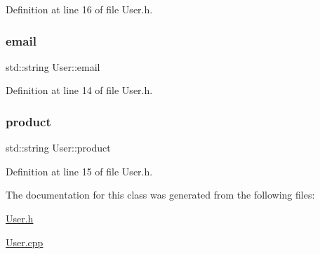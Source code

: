 Definition at line 16 of file User.\+h.

\mbox{\label{class_user_ac35b7c63228119cb91acdbd7ed32b8cb}} 
\subsubsection{\texorpdfstring{email}{email}}
{\footnotesize\ttfamily std\+::string User\+::email\hspace{0.3cm}{\ttfamily [private]}}



Definition at line 14 of file User.\+h.

\mbox{\label{class_user_a5f969245b125e607f44b1702e58df86e}} 
\subsubsection{\texorpdfstring{product}{product}}
{\footnotesize\ttfamily std\+::string User\+::product\hspace{0.3cm}{\ttfamily [private]}}



Definition at line 15 of file User.\+h.



The documentation for this class was generated from the following files\+:\begin{DoxyCompactItemize}
\item 
\mbox{\hyperlink{_user_8h}{User.\+h}}\item 
\mbox{\hyperlink{_user_8cpp}{User.\+cpp}}\end{DoxyCompactItemize}
